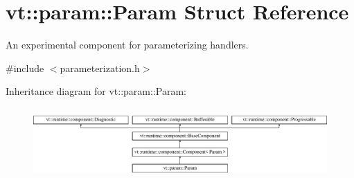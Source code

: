 \hypertarget{structvt_1_1param_1_1_param}{}\section{vt\+:\+:param\+:\+:Param Struct Reference}
\label{structvt_1_1param_1_1_param}


An experimental component for parameterizing handlers.  




{\ttfamily \#include $<$parameterization.\+h$>$}

Inheritance diagram for vt\+:\+:param\+:\+:Param\+:\begin{figure}[H]
\begin{center}
\leavevmode
\includegraphics[height=2.735043cm]{structvt_1_1param_1_1_param}
\end{center}
\end{figure}
